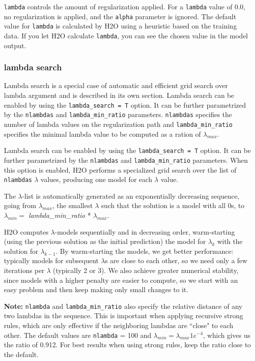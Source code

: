 \texttt{lambda} controls the amount of regularization applied.  For a \texttt{lambda} value of 0.0, no 
regularization is applied, and the \texttt{alpha} parameter is ignored.  The default value for \texttt{lambda} is
calculated by H2O using a heuristic based on the training data.  If you let H2O calculate \texttt{lambda}, you can
see the chosen value in the model output.

\subsubsection{lambda search}

Lambda search is a special case of automatic and efficient grid search over lambda argument and is described in its
own section. Lambda search can be enabled by using the \texttt{lambda\_search = T} option. It can be further
parametrized by the \texttt{nlambdas} and \texttt{lambda\_min\_ratio} parameters.
\texttt{nlambdas} specifies the number of lambda values on the regularization path and \texttt{lambda\_min\_ratio} 
specifies the minimal lambda value to be computed as a ration of $\lambda_{max}$.

Lambda search can be enabled by using the \texttt{lambda\_search = T} option. It can be further parametrized by
the \texttt{nlambdas} and \texttt{lambda\_min\_ratio} parameters. When this option is enabled, H2O performs a
specialized grid search over the list of \texttt{nlambdas} $\lambda$ values, producing one model for each $\lambda$
value.

The $\lambda$-list is automatically generated as an exponentially decreasing sequence, going from $\lambda_{max}$,
the smallest $\lambda$ such that the solution is a model with all 0s, to $\lambda_{min} =
$ \textit{lambda\_min\_ratio} * $ \lambda_{max}$.

H2O computes $\lambda$-models sequentially and in decreasing order, warm-starting (using the previous solution as
the initial prediction) the model for $\lambda_k$ with the solution for $\lambda_{k-1}$. By warm-starting the
models, we get better performance: typically models for subsequent $\lambda$s are close to each other, so we need
only a few iterations per $\lambda$ (typically 2 or 3). We also achieve greater numerical stability, since models
with a higher penalty are easier to compute, so we start with an easy problem and then keep making only small
changes to it.

\textbf{Note:} \texttt{nlambda} and \texttt{lambda\_min\_ratio} also specify the relative distance of any two
 lambdas in the sequence. This is important when applying recursive strong rules, which are only effective if the
neighboring lambdas are ``close" to each other. The default values are \texttt{nlambda} = 100 and $\lambda_{min}
= \lambda_{max} 1e^{-4}$, which gives us the ratio of 0.912.  For best results when using strong rules, keep the
ratio close to the default.

